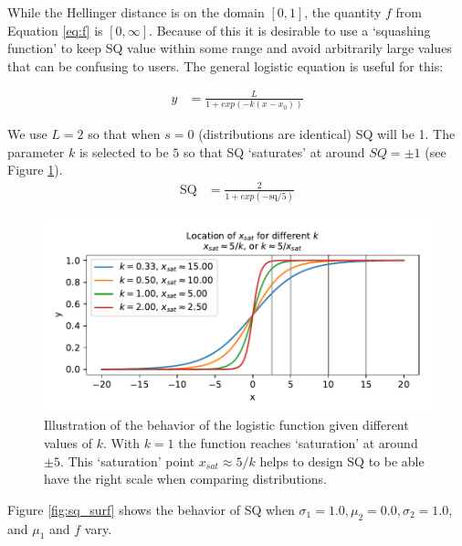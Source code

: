 While the Hellinger distance is on the domain $[0,1]$, the quantity $f$ from Equation \ref{eq:f} is $[0,\infty]$. Because of this it is desirable to use a `squashing function' to keep SQ value within some range and avoid arbitrarily large values that can be confusing to users. The general logistic equation is useful for this:

\begin{align}
    y &= \frac{L}{1+exp(-k(x-x_0))} \label{eq:get_log}
\end{align}

We use $L=2$ so that when $s=0$ (distributions are identical) SQ will be 1. The parameter $k$ is selected to be $5$ so that SQ `saturates' at around $SQ=\pm1$ (see Figure \ref{fig:log_sat}).
\begin{align}
    \text{SQ} &= \frac{2}{1+exp(-\text{sq}/5)}\label{eq:SQ}
\end{align}
\begin{figure}[tbp]
    \centering
    \includegraphics[width=0.9\linewidth]{Figures/logistic_saturation}
    \caption{Illustration of the behavior of the logistic function given different values of $k$. With $k=1$ the function reaches `saturation' at around $\pm5$. This `saturation' point $x_{sat}\approx 5/k$ helps to design SQ to be able have the right scale when comparing distributions.}
    \label{fig:log_sat}
\end{figure}

Figure \ref{fig:sq_surf} shows the behavior of SQ when $\sigma_1=1.0,\mu_2=0.0,\sigma_2=1.0$, and $\mu_1$ and $f$ vary.

